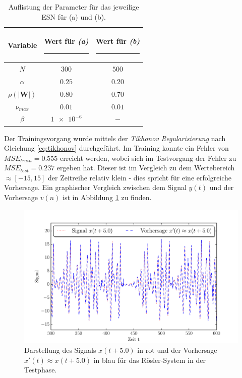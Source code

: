 \begin{table}[H]
	\centering
	\captionsetup{width=0.9\linewidth}
		\begin{tabular}{|c|c|c|}
		\rule[-1ex]{0pt}{3.5ex} Variable & \hspace{4ex} Wert für \textit{(a)} \rule[-1ex]{4ex}{0pt} & \hspace{4ex} Wert für \textit{(b)} \rule[-1ex]{4ex}{0pt}\\ 
		\hline \hline 
		\rule[-1ex]{0pt}{3.5ex} $N$ & $300$ & $500$ \\ 
		\hline 
		\rule[-1ex]{0pt}{3.5ex} $\alpha$ & $0.25$ & $0.20$ \\ 
		\hline 
		\rule[-1ex]{0pt}{3.5ex} $\rho(|\mathbf{W}|)$ & $0.80$ & $0.70$\\ 
		\hline 
		\rule[-1ex]{0pt}{3.5ex} $\nu_{max}$ & $0.01$ & $0.01$\\ 
		\hline 
		\rule[-1ex]{0pt}{3.5ex} $\beta$ & $\num{1e-6}$ & $-$\\ 
		\hline 
	\end{tabular} 
	\caption{Auflistung der Parameter für das jeweilige \textsc{ESN} für (a) und (b).}
	\label{tab:application_roessler}
\end{table}

Der Trainingsvorgang wurde mittels der \textit{Tikhonov Regularisierung} nach Gleichung \ref{eq:tikhonov} durchgeführt. Im Training konnte ein Fehler von $MSE_{train} = 0.555 	$ erreicht werden, wobei sich im Testvorgang der Fehler zu $MSE_{test} = 0.237$ ergeben hat. Dieser ist im Vergleich zu dem Wertebereich $\approx[-15,15]$ der Zeitreihe relativ klein - dies spricht für eine erfolgreiche Vorhersage. Ein graphischer Vergleich zwischen dem Signal $y(t)$ und der Vorhersage $v(n)$ ist in Abbildung \ref{fig:application_roessler_a} zu finden.

\vspace{-3.25ex}
\begin{figure}[H]
    \centering
    \includegraphics[width = 0.9 \textwidth]{figures/roessler_pred50.pdf}
    \caption{Darstellung des Signals $x(t+5.0)$ in rot und der Vorhersage $x'(t) \approx x(t+5.0)$ in blau für das Rösler-System in der Testphase.}
    \label{fig:application_roessler_a}
\end{figure}

